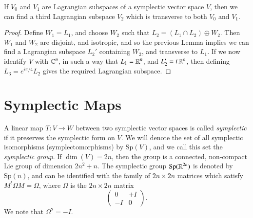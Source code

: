 \begin{lemma}
    If $V_0$ and $V_1$ are Lagrangian subspaces of a symplectic vector space $V$, then we can find a third Lagrangian subspace $V_2$ which is transverse to both $V_0$ and $V_1$.
\end{lemma}
\begin{proof}
    Define $W_1 = L_1$, and choose $W_2$ such that $L_2 = (L_1 \cap L_2) \oplus W_2$. Then $W_1$ and $W_2$ are disjoint, and isotropic, and so the previous Lemma implies we can find a Lagrangian subspace $L_2'$ containing $W_2$, and transverse to $L_1$. If we now identify $V$ with $\operatorname{\mathbb{C}}^n$, in such a way that $L_1 = \operatorname{\mathbb{R}}^n$, and $L_2' = i \operatorname{\mathbb{R}}^n$, then defining $L_3 = e^{i \pi / 4} L_2$ gives the required Lagrangian subspace.
\end{proof}

\section{Symplectic Maps}

A linear map $T: V \to W$ between two symplectic vector spaces is called \emph{symplectic} if it preserves the symplectic form on $V$. We will denote the set of all symplectic isomorphisms (symplectomorphisms) by $\text{Sp}(V)$, and we call this set the \emph{symplectic group}. If $\dim(V) = 2n$, then the group is a connected, non-compact Lie group of dimension $2n^2 + n$. The symplectic group $\text{Sp}(\operatorname{\mathbb{R}}^{2n})$ is denoted by $\text{Sp}(n)$, and can be identified with the family of $2n \times 2n$ matrices which satisfy $M^t \Omega M = \Omega$, where $\Omega$ is the $2n \times 2n$ matrix
%
\[ \begin{pmatrix} 0 & +I \\ -I & 0 \end{pmatrix}. \]
%
We note that $\Omega^2 = - I$.

